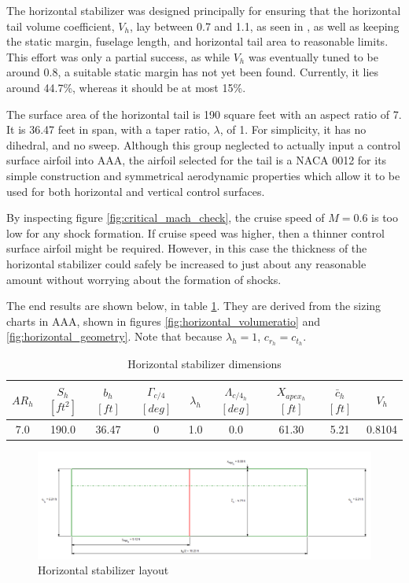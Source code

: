 \documentclass[conf]{new-aiaa}
\begin{document}
The horizontal stabilizer was designed principally for ensuring that the 
horizontal tail volume coefficient, $V_h$, lay between 0.7 and 1.1, as seen 
in \cite{orange_book}, as well as keeping the static margin, fuselage length, 
and horizontal tail area to reasonable limits. This effort was only a 
partial success, as while $V_h$ was eventually tuned to be around 0.8, a 
suitable static margin has not yet been found. Currently, it lies around 44.7\%,
whereas it should be at most 15\%.

The surface area of the horizontal tail is 190 square feet with an aspect 
ratio of 7. It is 36.47 feet in span, with a taper ratio, $\lambda$, of 1. 
For simplicity, it has no dihedral, and no sweep. Although this group 
neglected to actually input a control surface airfoil into AAA, the airfoil 
selected for the tail is a NACA 0012 for its simple construction and 
symmetrical aerodynamic properties which allow it to be used for both 
horizontal and vertical control surfaces.

By inspecting figure \ref{fig:critical_mach_check}, the cruise speed of 
$M=0.6$ is too low for any shock formation. If cruise speed was higher, 
then a thinner control surface airfoil might be required. However, in this 
case the thickness of the horizontal stabilizer could safely be increased to 
just about any reasonable amount without worrying about the formation of shocks.

The end results are shown below, in table 
\ref{tab:horizontal_stabilizer_size}. They are derived from the sizing 
charts in AAA, shown in figures \ref{fig:horizontal_volumeratio} and 
\ref{fig:horizontal_geometry}. Note that because $\lambda_h = 1$,
$c_{r_h} = c_{t_h}$.

\begin{table}[H]
\centering
\caption{Horizontal stabilizer dimensions}
\begin{tabular}{|c|c|c|c|c|c|c|c|c|}\hline
    $AR_h$ & $S_h$ $[ft^2]$ & $b_h$ $[ft]$ & $\Gamma_{c/4}$ $[deg]$ & $\lambda_h$ & $\Lambda_{c/4_h}$ $[deg]$ & $X_{apex_h}$ $[ft]$ & $\bar{c}_h$ $[ft]$ & $V_h$  \\ \hline
    7.0 & 190.0 & 36.47 & 0 & 1.0 & 0.0 & 61.30 & 5.21 & 0.8104 \\ \hline
\end{tabular}
\label{tab:horizontal_stabilizer_size}
\end{table}

\begin{figure}[H]
    \includegraphics[width=\textwidth]{Report3Printouts/Empannage/Horizontal_geometry_plot.png}
    \caption{Horizontal stabilizer layout}
    \label{fig:horizontal_geometry_plot}
\end{figure}
\end{document}
